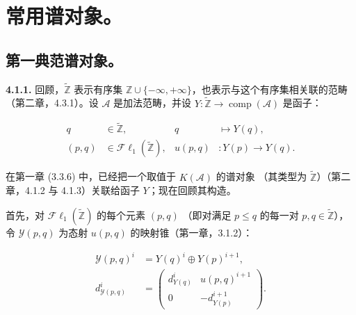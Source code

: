 \chapter{常用谱对象。}
%
\begingroup
\small
\setlength{\parskip}{0pt}
\setlength{\emergencystretch}{1.5em}
\setlength{\abovedisplayskip}{4pt plus 2pt minus 2pt}%
\setlength{\belowdisplayskip}{4pt plus 2pt minus 2pt}%

\section{第一典范谱对象。}

\noindent\textbf{4.1.1.}\quad
回顾，$\widetilde{\mathbb Z}$ 表示有序集
$\mathbb Z\cup\{-\infty,+\infty\}$，也表示与这个有序集相关联的范畴
（第二章，4.3.1）。设 $\mathcal A$ 是加法范畴，并设
$Y\colon\widetilde{\mathbb Z}\longrightarrow
\operatorname{comp}(\mathcal A)$ 是函子：

\begin{equation}
\begin{aligned}
q&\in\widetilde{\mathbb Z},
  &q&\longmapsto Y(q),\\
(p,q)&\in\mathcal{F}\ell_1(\widetilde{\mathbb Z}),
  &u(p,q)&\colon Y(p)\longrightarrow Y(q).
\end{aligned}
\tag{4.1.1.1}
\end{equation}

在第一章 (3.3.6) 中，已经把一个取值于 $K(\mathcal A)$ 的谱对象
（其类型为 $\widetilde{\mathbb Z}$）（第二章，4.1.2 与 4.1.3）关联给函子
$Y$；现在回顾其构造。

首先，对 $\mathcal{F}\ell_1(\widetilde{\mathbb Z})$ 的每个元素 $(p,q)$
（即对满足 $p\leq q$ 的每一对
$p,q\in\widetilde{\mathbb Z}$），令 $\mathcal Y(p,q)$ 为态射
$u(p,q)$ 的映射锥（第一章，3.1.2）：

\begin{equation}
\begin{aligned}
\mathcal Y(p,q)^i&=Y(q)^i\oplus Y(p)^{i+1},\\
d_{\mathcal Y(p,q)}^i
&=
\begin{pmatrix}
d_{Y(q)}^i & u(p,q)^{i+1}\\
0 & -d_{Y(p)}^{i+1}
\end{pmatrix}.
\end{aligned}
\tag{4.1.1.2}
\end{equation}

